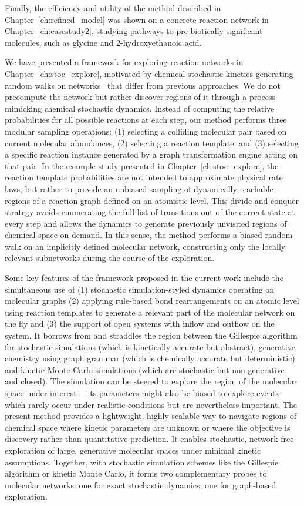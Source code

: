 Finally, the efficiency and utility of the method described in Chapter~\ref{ch:refined_model} was shown on a concrete reaction network in Chapter~\ref{ch:casestudy2}, studying pathways to pre-biotically significant molecules, such as glycine and 2-hydroxyethanoic acid. 

We have presented a framework for exploring reaction networks in Chapter~\ref{ch:stoc_explore}, motivated by chemical stochastic kinetics generating random walks on networks~\cite{randomwalk1,randomwalk2,randomwalk3} that differ from previous approaches. We do not precompute the network but rather discover regions of it through a process mimicking chemical stochastic dynamics. Instead of computing the relative probabilities for all possible reactions at each step, our method performs three modular sampling operations: (1) selecting a colliding molecular pair based on current molecular abundances, (2) selecting a reaction template, and (3) selecting a specific reaction instance generated by a graph transformation engine acting on that pair. In the example study presented in Chapter~\ref{ch:stoc_explore}, the reaction template probabilities are not intended to approximate physical rate laws, but rather to provide an unbiased sampling of dynamically reachable regions of a reaction graph defined on an atomistic level. This divide-and-conquer strategy avoids enumerating the full list of transitions out of the current state at every step and allows the dynamics to generate previously unvisited regions of chemical space on demand. In this sense, the method performs a biased random walk on an implicitly defined molecular network, constructing only the locally relevant subnetworks during the course of the exploration. 

Some key features of the framework proposed in the current work include the simultaneous use of (1) stochastic simulation-styled dynamics operating on molecular graphs (2) applying rule-based bond rearrangements on an atomic level using reaction templates to generate a relevant part of the molecular network on the fly and (3) the support of open systems with inflow and outflow on the system. 
It borrows from and straddles the region between the Gillespie algorithm for stochastic simulations (which is kinetically accurate but abstract), 
generative chemistry using graph grammar (which is chemically accurate but deterministic) and kinetic Monte Carlo simulations (which are stochastic but non-generative and closed). 
The simulation can be steered to explore the region of the molecular space under interest--- its parameters might also be biased to explore events which rarely occur under realistic conditions but are nevertheless important.
The present method provides a lightweight, highly scalable way to navigate regions of chemical space where kinetic parameters are unknown or where the objective is discovery rather than quantitative prediction.
It enables stochastic, network-free exploration of large, generative molecular spaces under minimal kinetic assumptions.
Together, with stochastic simulation schemes like the Gillespie algorithm or kinetic Monte Carlo, it forms two complementary probes to molecular networks: one for exact stochastic dynamics, one for graph-based exploration.


